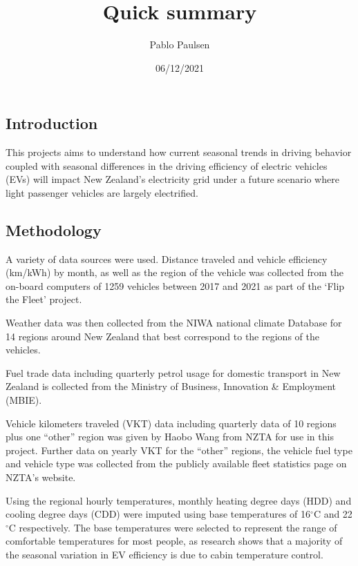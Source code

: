 \documentclass[
]{article}
\title{Quick summary}
\author{Pablo Paulsen}
\date{06/12/2021}
\begin{document}
\maketitle

\hypertarget{introduction}{%
\subsection{Introduction}\label{introduction}}

This projects aims to understand how current seasonal trends in driving
behavior coupled with seasonal differences in the driving efficiency of
electric vehicles (EVs) will impact New Zealand's electricity grid under
a future scenario where light passenger vehicles are largely
electrified.

\hypertarget{methodology}{%
\subsection{Methodology}\label{methodology}}

A variety of data sources were used. Distance traveled and vehicle
efficiency (km/kWh) by month, as well as the region of the vehicle was
collected from the on-board computers of 1259 vehicles between 2017 and
2021 as part of the `Flip the Fleet' project.

Weather data was then collected from the NIWA national climate Database
for 14 regions around New Zealand that best correspond to the regions of
the vehicles.

Fuel trade data including quarterly petrol usage for domestic transport
in New Zealand is collected from the Ministry of Business, Innovation \&
Employment (MBIE).

Vehicle kilometers traveled (VKT) data including quarterly data of 10
regions plus one ``other'' region was given by Haobo Wang from NZTA for
use in this project. Further data on yearly VKT for the ``other''
regions, the vehicle fuel type and vehicle type was collected from the
publicly available fleet statistics page on NZTA's website.

Using the regional hourly temperatures, monthly heating degree days
(HDD) and cooling degree days (CDD) were imputed using base temperatures
of 16\(^\circ\)C and 22\(^\circ\)C respectively. The base temperatures
were selected to represent the range of comfortable temperatures for
most people, as research shows that a majority of the seasonal variation
in EV efficiency is due to cabin temperature control\cite{ev_range}.
\end{document}
